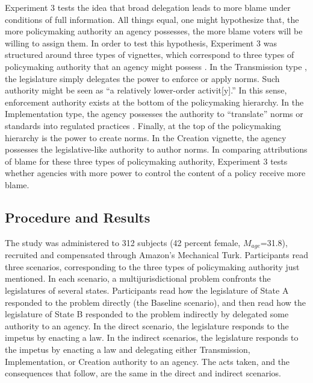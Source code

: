\documentclass{article}
\begin{document}
Experiment 3 tests the idea that broad delegation leads to more blame under conditions of full information. All things equal, one might hypothesize that, the more policymaking authority an agency possesses, the more blame voters will be willing to assign them. In order to test this hypothesis, Experiment 3 was structured around three types of vignettes, which correspond to three types of policymaking authority that an agency might possess \citep{Freeman2000}. In the Transmission type \citep{Stewart1975}, the legislature simply delegates the power to enforce or apply norms. Such authority might be seen as ``a relatively lower-order activit[y].'' \citep[p. 30]{Freeman2000} In this sense, enforcement authority exists at the bottom of the policymaking hierarchy. In the Implementation type, the agency possesses the authority to ``translate'' norms or standards into regulated practices \citep{Freeman2000}. Finally, at the top of the policymaking hierarchy is the power to create norms. In the Creation vignette, the agency possesses the legislative-like authority to author norms. In comparing attributions of blame for these three types of policymaking authority, Experiment 3 tests whether agencies with more power to control the content of a policy receive more blame. 

\subsection{Procedure and Results}

The study was administered to 312 subjects (42 percent female, $M_{age}$=31.8), recruited and compensated through Amazon's Mechanical Turk. Participants read three scenarios, corresponding to the three types of policymaking authority just mentioned. In each scenario, a multijurisdictional problem confronts the legislatures of several states. Participants read how the legislature of State A responded to the problem directly (the Baseline scenario), and then read how the legislature of State B responded to the problem indirectly by delegated some authority to an agency. In the direct scenario, the legislature responds to the impetus by enacting a law. In the indirect scenarios, the legislature responds to the impetus by enacting a law and delegating either Transmission, Implementation, or Creation authority to an agency. The acts taken, and the consequences that follow, are the same in the direct and indirect scenarios.
\end{document}
